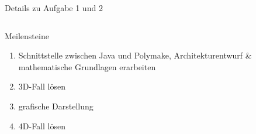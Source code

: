 \documentclass[ucs,11pt]{beamer}
\begin{document}
\begin{frame}{Details zu Aufgabe 1 und 2}
\begin{columns}
\begin{column}{.48\textwidth}
{}
\end{column}%
\end{columns}	
\end{frame}

\begin{frame}{Meilensteine}
	\begin{enumerate}
		\item Schnittstelle zwischen Java und Polymake, Architekturentwurf \& mathematische Grundlagen erarbeiten 
		\item 3D-Fall lösen
		\item grafische Darstellung
		\item 4D-Fall lösen
	\end{enumerate}
\end{frame}
\end{document}
